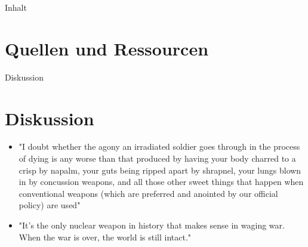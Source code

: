 

\maketitle
	\begin{frame}{Inhalt}
		\tableofcontents
	\end{frame}
	
	
	
	
	\section{Quellen und Ressourcen}
	\printbibliography
	\begin{frame}{Diskussion}
		\section{Diskussion}
		\begin{itemize}
			\item "I doubt whether the agony an irradiated soldier goes through in the process of dying is any worse than that produced by having your body charred to a crisp by napalm, your guts being ripped apart by shrapnel, your lungs blown in by concussion weapons, and all those other sweet things that happen when conventional weapons (which are preferred and anointed by our official policy) are used"
			\item "It’s the only nuclear weapon in history that makes sense in waging war. When the war is over, the world is still intact."
		\end{itemize}
	\end{frame}

